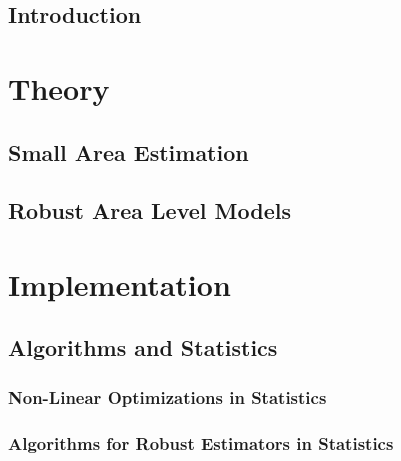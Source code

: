 % 

\chapter{Introduction}



\part{Theory}\label{part:theory}

\chapter{Small Area Estimation}







\chapter{Robust Area Level Models}








\part{Implementation}\label{part:implementation}



\chapter{Algorithms and Statistics}
\section{Non-Linear Optimizations in Statistics}
\section{Algorithms for Robust Estimators in Statistics}


